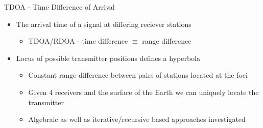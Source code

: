 \begin{frame}[t]{TDOA - Time Difference of Arrival}
    \begin{itemize}
        \item The arrival time of a signal at differing reciever stations
        \begin{itemize}
            \item TDOA/RDOA - time difference \( \equiv \) range difference
        \end{itemize}
        \item Locus of possible transmitter positions defines a hyperbola 
        \begin{itemize}
            \item Constant range difference between pairs of stations located at the foci
            \item Given 4 receivers and the surface of the Earth we can uniquely locate the transmitter
            \item Algebraic as well as iterative/recursive based approaches investigated
        \end{itemize}
    \end{itemize}


\end{frame}
